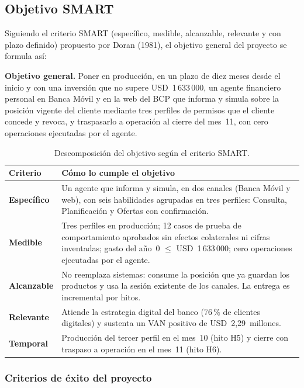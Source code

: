\documentclass[11pt,a4paper]{article}
\newcommand{\usd}[1]{USD~#1}
\newcommand{\clave}[1]{%
  \par\smallskip\noindent\colorbox{suave}{\parbox{\dimexpr\textwidth-2\fboxsep\relax}{\setstretch{1.15}\small #1}}\par\smallskip}
\begin{document}
\subsection{Objetivo SMART}\label{sec:smart}

Siguiendo el criterio SMART (específico, medible, alcanzable, relevante y con plazo definido) propuesto por Doran (1981), el objetivo general del proyecto se formula así:

\clave{\textbf{Objetivo general.} Poner en producción, en un plazo de diez meses desde el inicio y con una inversión que no supere \usd{1\,633\,000}, un agente financiero personal en Banca Móvil y en la web del BCP que informa y simula sobre la posición vigente del cliente mediante tres perfiles de permisos que el cliente concede y revoca, y traspasarlo a operación al cierre del mes~11, con cero operaciones ejecutadas por el agente.}

\begin{table}[H]
\centering
\caption{Descomposición del objetivo según el criterio SMART.}
\small
\begin{tabularx}{\textwidth}{@{}p{2.6cm} X@{}}
\toprule
\textbf{Criterio} & \textbf{Cómo lo cumple el objetivo} \\
\midrule
\textbf{Específico} & Un agente que informa y simula, en dos canales (Banca Móvil y web), con seis habilidades agrupadas en tres perfiles: Consulta, Planificación y Ofertas con confirmación. \\
\textbf{Medible} & Tres perfiles en producción; 12 casos de prueba de comportamiento aprobados sin efectos colaterales ni cifras inventadas; gasto del año~0 $\leq$ \usd{1\,633\,000}; cero operaciones ejecutadas por el agente. \\
\textbf{Alcanzable} & No reemplaza sistemas: consume la posición que ya guardan los productos y usa la sesión existente de los canales. La entrega es incremental por hitos. \\
\textbf{Relevante} & Atiende la estrategia digital del banco (76\,\% de clientes digitales) y sustenta un VAN positivo de \usd{2,29}~millones. \\
\textbf{Temporal} & Producción del tercer perfil en el mes~10 (hito H5) y cierre con traspaso a operación en el mes~11 (hito H6). \\
\bottomrule
\end{tabularx}
\end{table}

\subsubsection{Criterios de éxito del proyecto}
\end{document}
